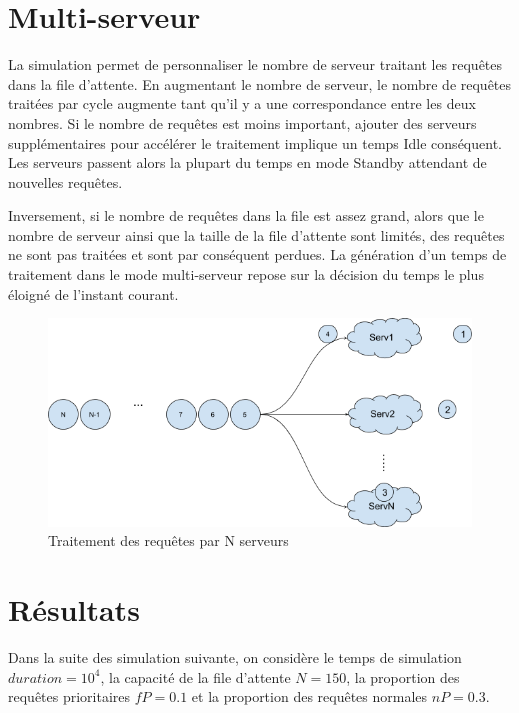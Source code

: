 \documentclass[12pt,a4paper]{article}
\begin{document}
        
    \newpage
    \section{Multi-serveur}
    \par La simulation permet de personnaliser le nombre de serveur traitant les requêtes dans la file d'attente.\newline
    En augmentant le nombre de serveur, le nombre de requêtes traitées par cycle augmente tant qu'il y a une correspondance entre les deux nombres. Si le nombre de requêtes est moins important, ajouter des serveurs supplémentaires pour accélérer le traitement implique un temps Idle conséquent. Les serveurs passent alors la plupart du temps en mode Standby attendant de nouvelles requêtes.
    \newline\par
    Inversement, si le nombre de requêtes dans la file est assez grand, alors que le nombre de serveur ainsi que la taille de la file d'attente sont limités, des requêtes ne sont pas traitées et sont par conséquent perdues.
    \newline
    La génération d'un temps de traitement dans le mode multi-serveur repose sur la décision du temps le plus éloigné de l'instant courant.
    \newline
    
    \begin{figure}[H]
        \includegraphics[scale=0.6]{servers.png}
        \caption{Traitement des requêtes par N serveurs}
    \end{figure}
    
        \newpage
    \section{Résultats}
    Dans la suite des simulation suivante, on considère le temps de simulation $duration = 10^4$, la capacité de la file d'attente $N = 150$, la proportion des requêtes prioritaires $fP = 0.1$ et la proportion des requêtes normales $nP = 0.3$.
\end{document}
